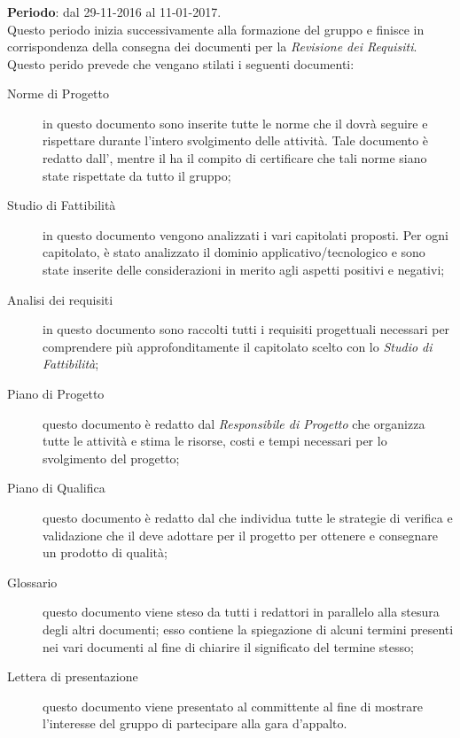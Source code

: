 	\subsubsection{\AR} \label{sec:AR}
	\textbf{Periodo}: dal 29-11-2016 al 11-01-2017.
	\\ Questo periodo inizia successivamente alla formazione del gruppo e finisce in corrispondenza della consegna dei documenti per la \emph{Revisione dei Requisiti}.
	Questo perido prevede che vengano stilati i seguenti documenti:
	\begin{description}
		\item[Norme di Progetto] in questo documento sono inserite tutte le norme che il  dovrà seguire e rispettare durante l'intero svolgimento delle attività. Tale documento è redatto dall'\AM{}, mentre il \V{} ha il compito di certificare che tali norme siano state rispettate da tutto il gruppo;
		\item[Studio di Fattibilità] in questo documento vengono analizzati i vari capitolati proposti. Per ogni capitolato, è stato analizzato il dominio applicativo/tecnologico e sono state inserite delle considerazioni in merito agli aspetti positivi e negativi;
		\item[Analisi dei requisiti] in questo documento sono raccolti tutti i requisiti progettuali necessari per comprendere più approfonditamente	il capitolato scelto con lo \emph{Studio di Fattibilità};
		\item[Piano di Progetto] questo documento è redatto dal \emph{Responsibile di Progetto} che organizza tutte le attività e stima le risorse, costi e tempi necessari per lo svolgimento del progetto;
		\item[Piano di Qualifica] questo documento è redatto dal \V{} che individua tutte le strategie di verifica e validazione che il  deve adottare per il progetto per ottenere e consegnare un prodotto di qualità;
		\item[Glossario] questo documento viene steso da tutti i redattori in parallelo alla stesura degli altri documenti; esso contiene la spiegazione di alcuni termini presenti nei vari documenti al fine di chiarire il significato del termine stesso;
		\item[Lettera di presentazione] questo documento viene presentato al committente al fine di mostrare l'interesse del gruppo di partecipare alla gara d'appalto.
	\end{description}
	
